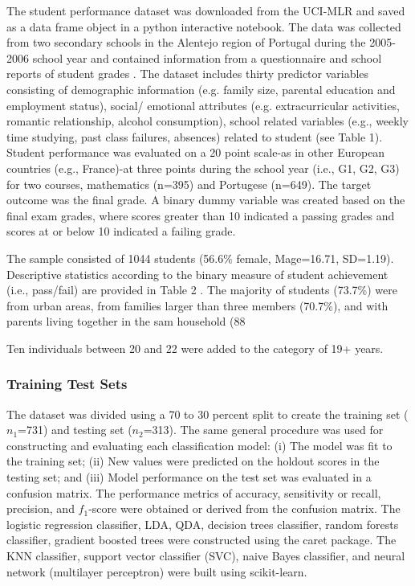 \documentclass[sigconf]{acmart}
\begin{document}
The student performance dataset was downloaded from the UCI-MLR and saved as 
a data frame object in a python interactive notebook. The data was collected 
from two secondary schools in the Alentejo region of Portugal during the 
2005-2006 school year and contained information from a questionnaire and 
school reports of student grades \cite{cortez09}. The dataset includes thirty 
predictor variables consisting of demographic information (e.g. family size, 
parental education and employment status), social/ emotional attributes 
(e.g. extracurricular activities, romantic relationship, alcohol consumption), 
school related variables (e.g., weekly time studying, past class failures, 
absences) related to student  (see Table 1). Student performance was evaluated 
on a 20 point scale-as in other European countries (e.g., France)-at three 
points during the school year (i.e., G1, G2, G3) for two courses, mathematics 
(n=395) and Portugese (n=649). The target outcome was the final grade. A binary 
dummy variable was created based on the final exam grades, where scores greater
than 10 indicated a passing grades and scores at or below 10 indicated a 
failing grade. 

The sample consisted of 1044 students (56.6\% female, Mage=16.71, SD=1.19). 
Descriptive statistics according to the binary measure of student achievement 
(i.e., pass/fail) are provided in Table 2 . The majority of students (73.7\%) 
were from urban areas, from families larger than three members (70.7\%), and 
with parents living together in the sam household (88%

Ten individuals between 20 and 22 were added to the category of 19+ years. 


\subsubsection{Training Test Sets}

The dataset was divided using a 70 to 30 percent split to create the training
set ($n_1$=731) and testing set ($n_2$=313). The same general procedure 
was used for constructing and evaluating each classification model: (i) The 
model was fit to the training set; (ii) New values were predicted on the 
holdout scores in the testing set; and (iii) Model performance on the test 
set was evaluated in a confusion matrix. The performance metrics of accuracy, 
sensitivity or recall, precision, and $f_1$-score were obtained or derived 
from the confusion matrix. The logistic regression classifier, LDA, QDA, 
decision trees classifier, random forests classifier, gradient boosted trees 
were constructed using the caret package. The KNN classifier, support 
vector classifier (SVC), naive Bayes classifier, and neural network 
(multilayer perceptron) were built using scikit-learn. 
\end{document}
